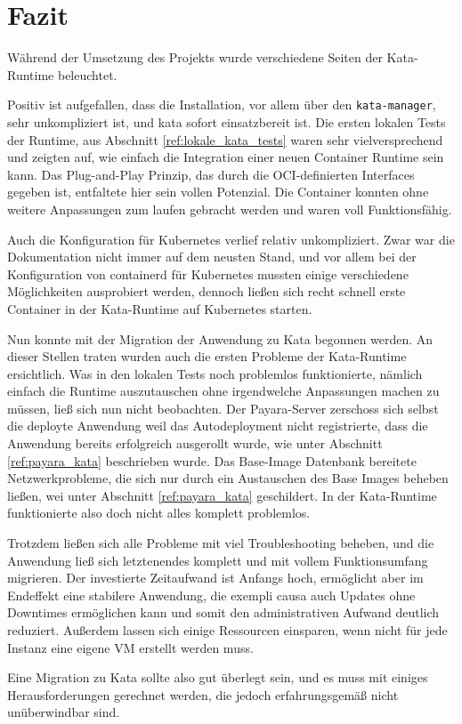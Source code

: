 \chapter{Fazit}

Während der Umsetzung des Projekts wurde verschiedene Seiten der Kata-Runtime beleuchtet.

Positiv ist aufgefallen, dass die Installation, vor allem über den \texttt{kata-manager}, sehr unkompliziert ist, und kata sofort einsatzbereit ist.
Die ersten lokalen Tests der Runtime, aus Abschnitt \ref{ref:lokale_kata_tests} waren sehr vielversprechend und zeigten auf, wie einfach die Integration einer neuen Container Runtime sein kann.
Das Plug-and-Play Prinzip, das durch die \ac{OCI}-definierten Interfaces gegeben ist, entfaltete hier sein vollen Potenzial.
Die Container konnten ohne weitere Anpassungen zum laufen gebracht werden und waren voll Funktionsfähig.

Auch die Konfiguration für Kubernetes verlief relativ unkompliziert. 
Zwar war die Dokumentation nicht immer auf dem neusten Stand, und vor allem bei der Konfiguration von containerd für Kubernetes mussten einige verschiedene Möglichkeiten ausprobiert werden, dennoch ließen sich recht schnell erste Container in der Kata-Runtime auf Kubernetes starten.

Nun konnte mit der Migration der Anwendung zu Kata begonnen werden.
An dieser Stellen traten wurden auch die ersten Probleme der Kata-Runtime ersichtlich.
Was in den lokalen Tests noch problemlos funktionierte, nämlich einfach die Runtime auszutauschen ohne irgendwelche Anpassungen machen zu müssen, ließ sich nun nicht beobachten.
Der Payara-Server zerschoss sich selbst die deployte Anwendung weil das Autodeployment nicht registrierte, dass die Anwendung bereits erfolgreich ausgerollt wurde, wie unter Abschnitt \ref{ref:payara_kata} beschrieben wurde.
Das Base-Image Datenbank bereitete Netzwerkprobleme, die sich nur durch ein Austauschen des Base Images beheben ließen, wei unter Abschnitt \ref{ref:payara_kata} geschildert.
In der Kata-Runtime funktionierte also doch nicht alles komplett problemlos.

Trotzdem ließen sich alle Probleme mit viel Troubleshooting beheben, und die Anwendung ließ sich letztenendes komplett und mit vollem Funktionsumfang migrieren.
Der investierte Zeitaufwand ist Anfangs hoch, ermöglicht aber im Endeffekt eine stabilere Anwendung, die exempli causa auch Updates ohne Downtimes ermöglichen kann und somit den administrativen Aufwand deutlich reduziert.
Außerdem lassen sich einige Ressourcen einsparen, wenn nicht für jede Instanz eine eigene \ac{VM} erstellt werden muss.

Eine Migration zu Kata sollte also gut überlegt sein, und es muss mit einiges Herausforderungen gerechnet werden, die jedoch erfahrungsgemäß nicht unüberwindbar sind.